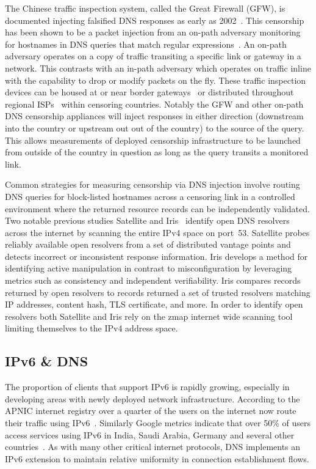 The Chinese traffic inspection system, called the Great Firewall (GFW),
is documented injecting falsified DNS responses as early as 2002~\cite{global2002great}.
This censorship has been shown to be a packet injection from an on-path adversary
monitoring for hostnames in DNS queries that match regular
expressions~\cite{USESEC21:GFWatch}. An on-path adversary
operates on a copy of traffic transiting a specific link or gateway in a network.
This contrasts with an in-path adversary which operates on traffic inline with
the capability to drop or modify packets on the fly. These traffic inspection
devices can be housed at or near border gateways~\cite{xu2011internet} or
distributed throughout regional ISPs~\cite{ramesh2020decentralized} within
censoring countries. Notably the GFW and other on-path DNS censorship appliances
will inject responses in either direction (downstream into the country or
upstream out out of the country) to the source of the query. This allows
measurements of deployed censorship infrastructure to be launched from outside
of the country in question as long as the query transits a monitored link.

Common strategies for measuring censorship via DNS injection involve routing DNS queries for
block-listed hostnames across a censoring link in a controlled environment where
the returned resource records can be independently validated. Two notable previous
studies Satellite and Iris~\cite{scott2016satellite,pearce2017global} identify
open DNS resolvers across the internet by scanning the entire IPv4 space on port~53.
Satellite probes reliably available open resolvers from a set of distributed vantage
points and detects incorrect or inconsistent response information. Iris develops
a method for identifying active manipulation in contrast to misconfiguration by
leveraging metrics such as consistency and independent verifiability. Iris
compares records returned by open resolvers to records returned a set of trusted
resolvers matching IP addresses, content hash, TLS certificate, and more.
In order to identify open resolvers both Satellite and Iris rely on the zmap
internet wide scanning tool~\cite{Durumeric13zmap} limiting themselves to the IPv4 address space.

\subsection{IPv6 \& DNS}
\label{subsec:v4vsv6}

The proportion of clients that support IPv6 is rapidly growing, especially in
developing areas with newly deployed network infrastructure.
According to the APNIC internet registry over a quarter of the users
on the internet now route their traffic using IPv6~\cite{Huston-APNIC2021}.
Similarly Google metrics indicate that over 50\% of users access services using
IPv6 in India, Saudi Arabia, Germany and several other countries~\cite{Google-IPv6}.
As with many other critical internet protocols, DNS implements an IPv6 extension
to maintain relative uniformity in connection establishment flows.

